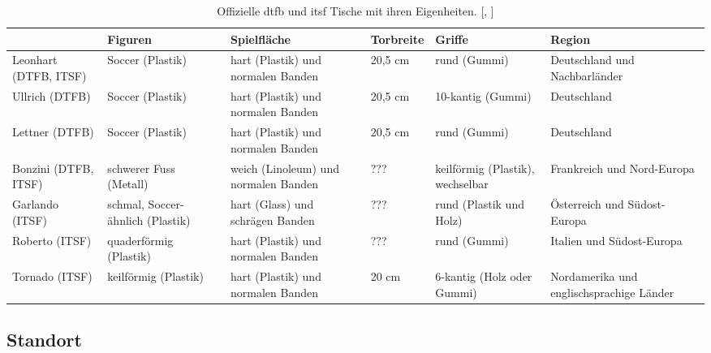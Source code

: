   {\small
\begin{center} 
    \begin{table} 
        \begin{tabular}{ p{1.5cm}||p{2cm}|p{2cm}|p{1.5cm}|p{2cm}|p{2cm}} 
            & Figuren & Spielfläche & Torbreite & Griffe & Region \\ 
            \hline 
            \hline 
            Leonhart (DTFB, ITSF) & Soccer (Plastik) & hart (Plastik) und normalen Banden & 20,5 cm & rund (Gummi) & Deutschland und Nachbarländer \\ 
            \hline 
            Ullrich  (DTFB) &  Soccer (Plastik) &  hart (Plastik) und normalen Banden & 20,5 cm & 10-kantig (Gummi) & Deutschland \\ 
            \hline 
            Lettner (DTFB)  & Soccer (Plastik)  &  hart (Plastik) und normalen Banden & 20,5 cm & rund (Gummi) & Deutschland \\ 
            \hline 
            Bonzini (DTFB, ITSF)  & schwerer Fuss (Metall) & weich (Linoleum) und normalen Banden & ??? & keilförmig (Plastik), wechselbar & Frankreich und Nord-Europa \\ 
            \hline 
            Garlando (ITSF)  & schmal, Soccer-ähnlich (Plastik) &  hart (Glass) und schrägen Banden & ??? & rund (Plastik und Holz) & Österreich und Südost-Europa \\ 
            \hline 
            Roberto (ITSF) & quaderförmig (Plastik) &  hart (Plastik) und normalen Banden & ??? & rund (Gummi) & Italien und Südost-Europa \\ 
            \hline 
            Tornado (ITSF)  & keilförmig (Plastik) &  hart (Plastik) und normalen Banden & 20 cm  & 6-kantig (Holz oder Gummi) & Nordamerika und englischsprachige Länder \\ 
        \end{tabular} 
        \caption{Offizielle \gls{dtfb} und \gls{itsf} Tische mit ihren Eigenheiten. [\cite{www:kickerbau}, \cite{www:tischfussball-online}]}
        \label{tab:tische}
    \end{table} 
\end{center}
}



\subsection{Standort}
\label{tisch:tisch:standort}




